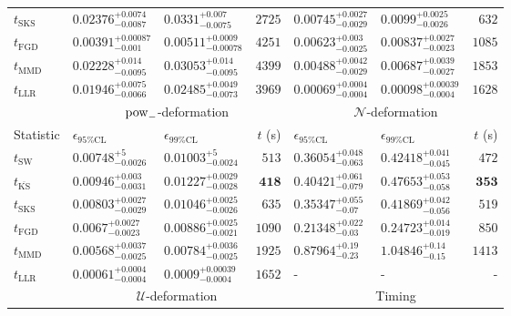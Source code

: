 \begin{tabular}{l|llr|llr}
	$t_{\mathrm{SKS}}$ & $0.02376_{-0.0087}^{+0.0074}$ & $0.0331_{-0.0075}^{+0.007}$ & $2725$ & $0.00745_{-0.0029}^{+0.0027}$ & $0.0099_{-0.0026}^{+0.0025}$ & $632$ \\
	$t_{\mathrm{FGD}}$ & ${\mathbf{0.00391_{-0.001}^{+0.00087}}}$ & ${\mathbf{0.00511_{-0.00078}^{+0.0009}}}$ & $4251$ & $0.00623_{-0.0025}^{+0.003}$ & $0.00837_{-0.0023}^{+0.0027}$ & $1085$ \\
	$t_{\mathrm{MMD}}$ & $0.02228_{-0.0095}^{+0.014}$ & $0.03053_{-0.0095}^{+0.014}$ & $4399$ & ${\mathbf{0.00488_{-0.0029}^{+0.0042}}}$ & ${\mathbf{0.00687_{-0.0027}^{+0.0039}}}$ & $1853$ \\
	$t_{\mathrm{LLR}}$ & $0.01946_{-0.0066}^{+0.0075}$ & $0.02485_{-0.0073}^{+0.0049}$ & $3969$ & $0.00069_{-0.0004}^{+0.0004}$ & $0.00098_{-0.0004}^{+0.00039}$ & $1628$ \\
	\toprule
	\multicolumn{1}{c}{} & \multicolumn{3}{c}{$\rm{pow}_{-}$-deformation} & \multicolumn{3}{c}{$\mathcal{N}$-deformation} \\
	Statistic & $\epsilon_{95\%\mathrm{CL}}$ & $\epsilon_{99\%\mathrm{CL}}$ & $t$ (s) & $\epsilon_{95\%\mathrm{CL}}$ & $\epsilon_{99\%\mathrm{CL}}$ & $t$ (s) \\
	\midrule
	$t_{\mathrm{SW}}$ & $0.00748_{-0.0026}^{+5}$ & $0.01003_{-0.0024}^{+5}$ & $513$ & $0.36054_{-0.063}^{+0.048}$ & $0.42418_{-0.045}^{+0.041}$ & $472$ \\
	$t_{\overline{\mathrm{KS}}}$ & $0.00946_{-0.0031}^{+0.003}$ & $0.01227_{-0.0028}^{+0.0029}$ & ${\mathbf{418}}$ & $0.40421_{-0.079}^{+0.061}$ & $0.47653_{-0.058}^{+0.053}$ & ${\mathbf{353}}$ \\
	$t_{\mathrm{SKS}}$ & $0.00803_{-0.0029}^{+0.0027}$ & $0.01046_{-0.0026}^{+0.0025}$ & $635$ & $0.35347_{-0.07}^{+0.055}$ & $0.41869_{-0.056}^{+0.042}$ & $519$ \\
	$t_{\mathrm{FGD}}$ & $0.0067_{-0.0023}^{+0.0027}$ & $0.00886_{-0.0021}^{+0.0025}$ & $1090$ & ${\mathbf{0.21348_{-0.03}^{+0.022}}}$ & ${\mathbf{0.24723_{-0.019}^{+0.014}}}$ & $850$ \\
	$t_{\mathrm{MMD}}$ & ${\mathbf{0.00568_{-0.0025}^{+0.0037}}}$ & ${\mathbf{0.00784_{-0.0025}^{+0.0036}}}$ & $1925$ & $0.87964_{-0.23}^{+0.19}$ & $1.04846_{-0.15}^{+0.14}$ & $1413$ \\
	$t_{\mathrm{LLR}}$ & $0.00061_{-0.0004}^{+0.0004}$ & $0.0009_{-0.0004}^{+0.00039}$ & $1652$ & - & - & - \\
	\toprule
	\multicolumn{1}{c}{} & \multicolumn{3}{c}{$\mathcal{U}$-deformation} & \multicolumn{3}{c}{Timing} \\

\end{tabular}
